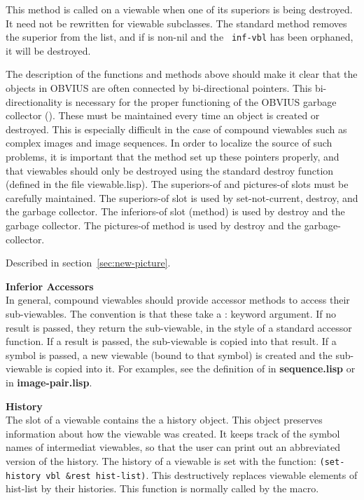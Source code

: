 \begin{description}
\item{}
This method is called on a viewable when one of its superiors is being
destroyed.  It need not be rewritten for viewable subclasses.  The
standard method removes the superior from the 
list, and if  is non-nil and the {\tt
inf-vbl} has been orphaned, it will be destroyed.

The description of the functions and methods above should make it
clear that the objects in OBVIUS are often connected by bi-directional
pointers.  This bi-directionality is necessary for the proper
functioning of the OBVIUS garbage collector ().
These must be maintained every time an object is created or
destroyed.  This is especially difficult in the case of compound
viewables such as complex images and image sequences.  In order to
localize the source of such problems, it is important that the
 method set up these pointers properly, and
that viewables should only be destroyed using the standard destroy
function (defined in the file viewable.lisp).  The superiors-of and
pictures-of slots must be carefully maintained.  The superiors-of slot
is used by set-not-current, destroy, and the garbage collector.  The
inferiors-of slot (method) is used by destroy and the garbage
collector. The pictures-of method is used by destroy and the
garbage-collector.
 
\item{}
Described in section~\ref{sec:new-picture}.

\item {\bf Inferior Accessors} \\
In general, compound viewables should provide accessor methods to
access their sub-viewables.  The convention is that these take a :\res
keyword argument.  If no result is passed, they return the
sub-viewable, in the style of a standard accessor function.  If a
result is passed, the sub-viewable is copied into that result. If a
symbol is passed, a new viewable (bound to that symbol) is created and
the sub-viewable is copied into it.  For examples, see the definition
of  in {\bf sequence.lisp} or  in {\bf
image-pair.lisp}.

\item {\bf History} \\
The  slot of a viewable contains the a history object.
This object preserves information about how the viewable was created.
It keeps track of the symbol names of intermediat viewables, so that
the user can print out an abbreviated version of the history.  The
history of a viewable is set with the  function:
{\tt (set-history vbl \&rest hist-list)}.  This destructively replaces
viewable elements of hist-list by their histories.  This function is
normally called by the  macro.
\end{description}


